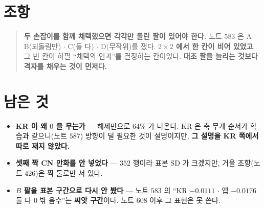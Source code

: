 \documentclass[11pt]{article}
\begin{document}
\section*{조항}

\begin{quote}
\textbf{두 손잡이를 함께 채택했으면 각각만 돌린 팔이 있어야 한다.} 노트
$583$ 은 A $\cdot$ B(되돌림만) $\cdot$ C(둘 다) $\cdot$ D(무작위)를 쟀다.
\textbf{$2\times2$ 에서 한 칸이 비어 있었고}, 그 빈 칸이 하필 ``채택의
인과''를 결정하는 칸이었다. \textbf{대조 팔을 늘리는 것보다 격자를 채우는
것이 먼저다.}
\end{quote}

\section*{남은 것}

\begin{itemize}
\item \textbf{KR 이 왜 $0$ 을 무는가} --- 해제만으로 $64\%$ 가 나온다.
KR 은 축 무게 순서가 학습과 같으니(노트 $587$) 방향이 덜 필요한 것이
설명이지만, \textbf{그 설명을 KR 쪽에서 따로 재지 않았다.}
\item \textbf{셋째 짝 CN 만화를 안 넣었다} --- $352$ 행이라 표본 SD 가
크겠지만, 거울 조항(노트 $426$)은 짝 둘로만 서 있다.
\item \textbf{$B$ 팔을 표본 구간으로 다시 안 봤다} --- 노트 $583$ 의
``KR $-0.0111$ $\cdot$ 앱 $-0.0176$ 둘 다 $0$ 밖 음수''는 \textbf{씨앗
구간}이다. 노트 $608$ 이후 그 표현은 못 쓴다.
\end{itemize}
\end{document}
